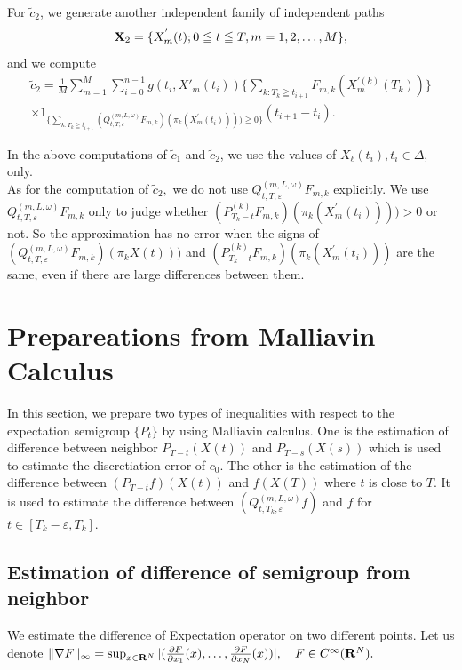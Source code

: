 \documentclass[12pt]{article}
\begin{document}
For $\tilde{c}_2$, we generate another independent family of independent paths $${\bf X}_2=\{X^{'}_{m }(t); 0 \leqq t \leqq T,  m =1,2,\ldots ,M\},$$
and we compute 
\begin{multline*}
\tilde{c}_2= \frac{1}{M} \sum_{m=1}^M \sum_{i=0}^{n-1} g(t_i, X'_m(t_i)) \{ \sum_{k:T_k\geqq t_{i+1}}F_{m,k}(X_m^{'(k)}(T_k))\}\\
 \times 1_{\{\sum_{k:T_k\geqq t_{i+1}} (Q_{t,T,\varepsilon}^{(m,L,\omega)}F_{m,k})(\pi_k(X^{'}_m(t_i)))) \geqq 0\}}(t_{i+1}-t_i).
 \end{multline*}

In the above computations of $\tilde{c}_1$ and $\tilde{c}_2$, we use the values of $X_{\ell}(t_i), t_i \in \Delta$, only.\\
As for the computation of $\tilde{c}_2,$  we do not use $Q_{t,T,\varepsilon}^{(m,L,\omega)}F_{m,k}$ explicitly.
We use $Q_{t,T,\varepsilon}^{(m,L,\omega)}F_{m,k}$ only to judge whether $(P^{(k)}_{T_k-t} F_{m,k})(\pi_k(X^{'}_m(t_i))))>0$ or not. 
 So the approximation has no error when the signs of  $(Q_{t,T,\varepsilon}^{(m,L,\omega)} F_{m,k})(\pi_k{X}(t)))$ and $(P^{(k)}_{T_k-t} F_{m,k})(\pi_k(X^{'}_m(t_i)))$ are the same, even if there are large differences between them.

\section{Prepareations from Malliavin Calculus}
In this section, we prepare two types of inequalities with respect to 
the expectation semigroup $\{P_t\}$ by using Malliavin calculus.
One is the estimation of difference between neighbor
$P_{T-t}(X(t))$ and $P_{T-s}(X(s))$ which is used to estimate the discretiation
error of $c_0$. The other is the estimation of the difference between 
$(P_{T-t}f)(X(t))$ and $f(X(T))$ where $t$ is close to $T$. It is used to estimate 
the difference between $(Q_{t,T_k,\varepsilon}^{(m,L,\omega)}f)$ and $f$ for $t \in [T_k -\varepsilon
, T_k].$
\subsection{Estimation of difference of semigroup from neighbor}
We estimate the difference of Expectation operator on two different points.
Let us denote $\|\nabla F\|_{\infty}=\sup_{x \in {\bf R}^N}|(\frac{\partial F}{\partial x_1}(x), \ldots, \frac{\partial F}{\partial x_N}(x))|, \quad F \in C^{\infty}({\bf R}^N).$
\end{document}
